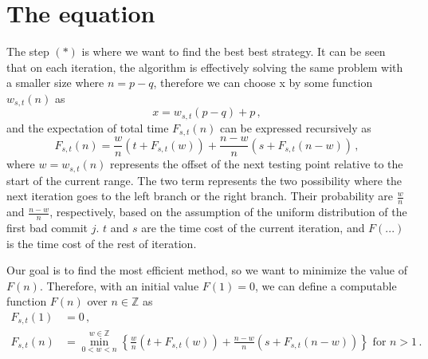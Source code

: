 \documentclass[]{article}
\begin{document}

\section{The equation}

The step $(*)$ is where we want to find the best best strategy. It can be seen that on each iteration, the algorithm is effectively solving the same problem with a smaller size where $n = p - q$, therefore we can choose x by some function $w_{s,t}(n)$ as
\[
x = w_{s,t}(p - q) + p \,,
\]
and the expectation of total time $F_{s,t}(n)$ can be expressed recursively as
\begin{equation}
F_{s,t}(n) = \frac{w}{n}(t + F_{s,t}(w)) + \frac{n-w}{n}(s + F_{s,t}(n-w))\,,
\end{equation}
where $w = w_{s,t}(n)$ represents the offset of the next testing point relative to the start of the current range. The two term represents the two possibility where the next iteration goes to the left branch or the right branch. Their probability are $\frac{w}{n}$ and $\frac{n-w}{n}$, respectively, based on the assumption of the uniform distribution of the first bad commit $j$. $t$ and $s$ are the time cost of the current iteration, and $F(...)$ is the time cost of the rest of iteration.

Our goal is to find the most efficient method, so we want to minimize the value of $F(n)$. Therefore, with an initial value $F(1) = 0$, we can define a computable function $F(n)$ over $n \in \mathbb{Z}$ as
\begin{align*}
F_{s,t}(1) &= 0\,,\\
F_{s,t}(n) &= \min_{0<w<n}^{w\in\mathbb{Z}}\left\{\frac{w}{n}(t + F_{s,t}(w)) + \frac{n-w}{n}(s + F_{s,t}(n-w))\right\} \textrm{ for } n > 1 \,.
\end{align*}
\end{document}
